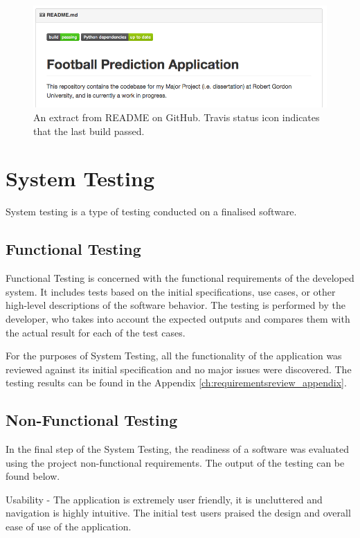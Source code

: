 \begin{figure}[H]
	\begin{center}
		\includegraphics[width=.90\linewidth,natwidth=610,natheight=642]{testing/images/travisBadge}
		\caption{An extract from README on GitHub. Travis status icon indicates that the last build passed.}
		\label{fig:using:travisbadge}
	\end{center}
\end{figure}

\section{System Testing}
\label{sec:system_test}
System testing is a type of testing conducted on a finalised software.  

\subsection*{Functional Testing}
Functional Testing is concerned with the functional requirements of the developed system. It includes tests based on the initial specifications, use cases, or other high-level descriptions of the software behavior. The testing is performed by the developer, who takes into account the expected outputs and compares them with the actual result for each of the test cases.

For the purposes of System Testing, all the functionality of the application was reviewed against its initial specification and no major issues were discovered. The testing results can be found in the Appendix \ref{ch:requirementsreview_appendix}.

\subsection*{Non-Functional Testing}
In the final step of the System Testing, the readiness of a software was evaluated using the project non-functional requirements. The output of the testing can be found below. 

Usability - The application is extremely user friendly, it is uncluttered and navigation is highly intuitive. The initial test users praised the design and overall ease of use of the application.

